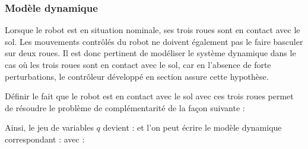 			\subsubsection{Modèle dynamique}
				
				Lorsque le robot est en situation nominale, ses trois roues sont en contact avec le sol. 
				Les mouvements contrôlés du robot ne doivent également pas le faire basculer sur deux roues.
				Il est donc pertinent de modéliser le système dynamique dans le cas où les trois roues sont en contact avec le sol, 
				car en l'absence de forte perturbations, le contrôleur développé en section  assure cette hypothèse.
			
				Définir le fait que le robot est en contact avec le sol avec ces trois roues permet de résoudre le problème de complémentarité de la façon suivante :
				
				Ainsi, le jeu de variables $q$ devient :
				et l'on peut écrire le modèle dynamique correspondant :
				avec :			
			
